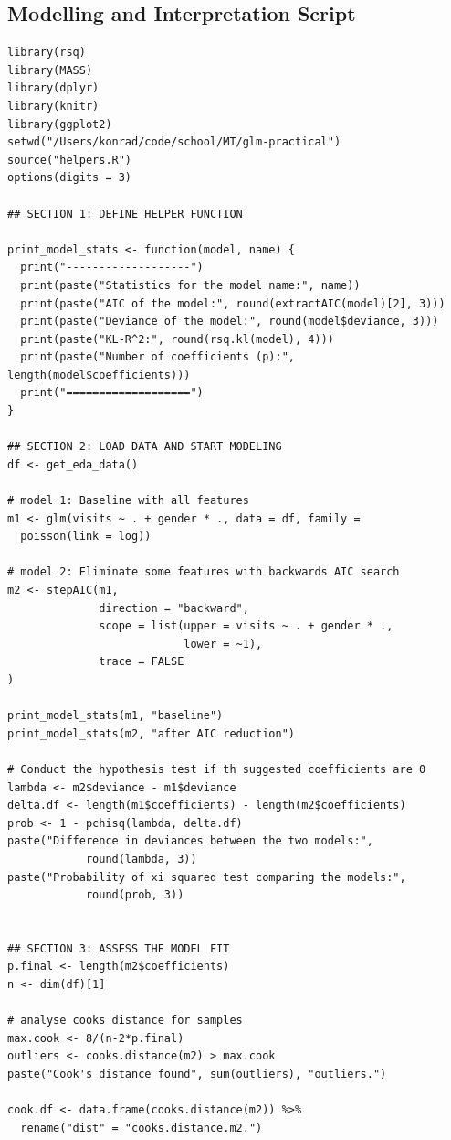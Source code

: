 \documentclass[a4paper,11pt]{article}
\begin{document}
\subsection{Modelling and Interpretation Script}

\begin{verbatim}
library(rsq)
library(MASS)
library(dplyr)
library(knitr)
library(ggplot2)
setwd("/Users/konrad/code/school/MT/glm-practical")
source("helpers.R")
options(digits = 3)

## SECTION 1: DEFINE HELPER FUNCTION

print_model_stats <- function(model, name) {
  print("-------------------")
  print(paste("Statistics for the model name:", name))
  print(paste("AIC of the model:", round(extractAIC(model)[2], 3)))
  print(paste("Deviance of the model:", round(model$deviance, 3)))
  print(paste("KL-R^2:", round(rsq.kl(model), 4)))
  print(paste("Number of coefficients (p):", length(model$coefficients)))
  print("===================")
}

## SECTION 2: LOAD DATA AND START MODELING
df <- get_eda_data()

# model 1: Baseline with all features
m1 <- glm(visits ~ . + gender * ., data = df, family =
  poisson(link = log))

# model 2: Eliminate some features with backwards AIC search
m2 <- stepAIC(m1,
              direction = "backward",
              scope = list(upper = visits ~ . + gender * .,
                           lower = ~1),
              trace = FALSE
)

print_model_stats(m1, "baseline")
print_model_stats(m2, "after AIC reduction")

# Conduct the hypothesis test if th suggested coefficients are 0
lambda <- m2$deviance - m1$deviance
delta.df <- length(m1$coefficients) - length(m2$coefficients)
prob <- 1 - pchisq(lambda, delta.df)
paste("Difference in deviances between the two models:",
            round(lambda, 3))
paste("Probability of xi squared test comparing the models:",
            round(prob, 3))


## SECTION 3: ASSESS THE MODEL FIT
p.final <- length(m2$coefficients)
n <- dim(df)[1]

# analyse cooks distance for samples
max.cook <- 8/(n-2*p.final)
outliers <- cooks.distance(m2) > max.cook
paste("Cook's distance found", sum(outliers), "outliers.")

cook.df <- data.frame(cooks.distance(m2)) %>%
  rename("dist" = "cooks.distance.m2.")


\end{verbatim}
\end{document}
